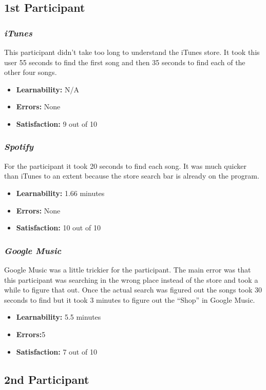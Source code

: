\documentclass{article}
\begin{document}
{\begin{multicols}{2}
\subsection{1st Participant}

\subsubsection{\it iTunes}
This participant didn’t take too long to understand the iTunes store. It took this user 55 seconds to find the first song and then 35 seconds to find each of the other four songs. 
\begin{itemize}
	\item {\bf Learnability:} N/A
	\item {\bf Errors:}  None
	\item {\bf Satisfaction:} 9 out of 10 
\end{itemize}

\subsubsection{\it Spotify}
For the participant it took 20 seconds to find each song. It was much quicker than iTunes to an extent because the store search bar is already on the program.
\begin{itemize}
	\item {\bf Learnability:} 1.66 minutes
	\item {\bf Errors:} None
	\item {\bf Satisfaction:} 10 out of 10 
\end{itemize}

\subsubsection{\it Google Music}
Google Music was a little trickier for the participant. The main error was that this participant was searching in the wrong place instead of the store and took a while to figure that out. Once the actual search was figured out the songs took 30 seconds to find but it took 3 minutes to figure out the “Shop” in Google Music.
\begin{itemize}
\item {\bf Learnability:} 5.5 minutes
	\item {\bf Errors:}5
	\item {\bf Satisfaction:} 7 out of 10 
\end{itemize} 

\subsection{2nd Participant}


\end{multicols}}
\end{document}
